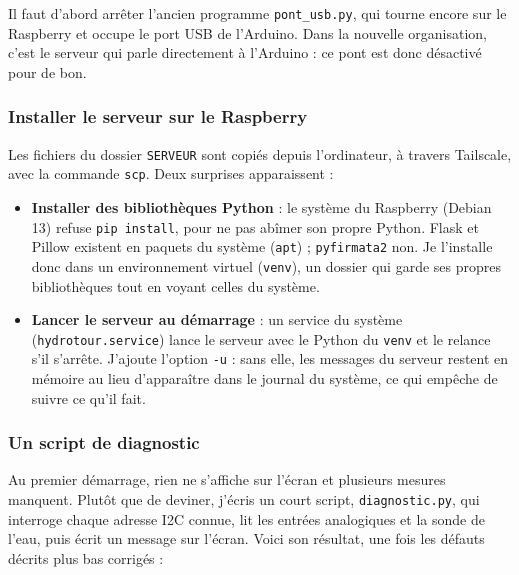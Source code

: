 Il faut d'abord arrêter l'ancien programme \texttt{pont\_usb.py}, qui tourne encore sur le Raspberry et occupe le port USB de l'Arduino. Dans la nouvelle organisation, c'est le serveur qui parle directement à l'Arduino : ce pont est donc désactivé pour de bon.

\subsubsection*{Installer le serveur sur le Raspberry}

Les fichiers du dossier \texttt{SERVEUR} sont copiés depuis l'ordinateur, à travers Tailscale, avec la commande \texttt{scp}. Deux surprises apparaissent :

\begin{itemize}
\item \textbf{Installer des bibliothèques Python} : le système du Raspberry (Debian 13) refuse \texttt{pip install}, pour ne pas abîmer son propre Python. Flask et Pillow existent en paquets du système (\texttt{apt}) ; \texttt{pyfirmata2} non. Je l'installe donc dans un environnement virtuel (\texttt{venv}), un dossier qui garde ses propres bibliothèques tout en voyant celles du système.
\item \textbf{Lancer le serveur au démarrage} : un service du système (\texttt{hydrotour.service}) lance le serveur avec le Python du \texttt{venv} et le relance s'il s'arrête. J'ajoute l'option \texttt{-u} : sans elle, les messages du serveur restent en mémoire au lieu d'apparaître dans le journal du système, ce qui empêche de suivre ce qu'il fait.
\end{itemize}

\subsubsection*{Un script de diagnostic}

Au premier démarrage, rien ne s'affiche sur l'écran et plusieurs mesures manquent. Plutôt que de deviner, j'écris un court script, \texttt{diagnostic.py}, qui interroge chaque adresse I2C connue, lit les entrées analogiques et la sonde de l'eau, puis écrit un message sur l'écran. Voici son résultat, une fois les défauts décrits plus bas corrigés :

